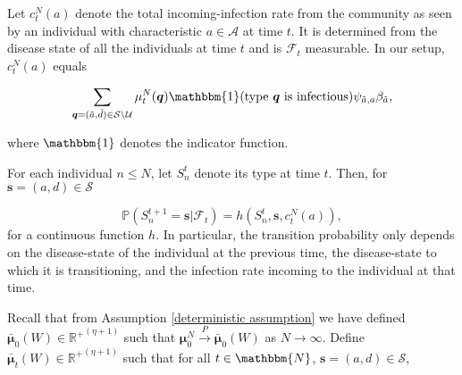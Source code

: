 \documentclass{article}
\theoremstyle{definition}
\newcommand{\Real}{\mathbb{R}}
\begin{document}
 Let $c^N_{t}({a})$ denote the total incoming-infection rate from the community as seen by an individual with characteristic ${a}\in\mathcal A$ at time $t$.  It is determined from the disease state of all the individuals at time  $t$ and is $\mathcal F_{t}$ measurable. In our setup, $c^N_{t}({a})$ equals 
 
  \begin{equation}
    \sum\limits_{\bm{q}=(\tilde{a},\tilde{d}) \in \mathcal S \setminus  \mathcal U} \mu^N_{t}(\bm{q}) \mathbbm{1}(\text{type }\bm{q} \text{ is infectious}) \psi_{\tilde{a},{a}} \beta_{\tilde{a}},
    \label{cnt}
    \end{equation}
  

 
 
  
  
  
 
  
  where $\mathbbm{1}$ denotes the indicator function. 
  
  For each individual $n \leq N$, let $S^t_n$ denote its type at time $t$.  Then,  for  $\bm{s}=(a,d) \in \mathcal S$
  
  $$\mathbb{P}\left( S^{t+1}_n = \bm{s} | \mathcal F_{t} \right) = {h}(S^{t}_n, \bm{s},  c^N_{t}({a})),$$
 for a continuous function $h$. 
 In particular, the transition probability only depends on the disease-state of the individual at the previous time, the disease-state to which it is transitioning, and the infection rate incoming to the individual at that time. 


 
Recall that from Assumption \ref{deterministic assumption} we have defined $\bm{\bar{\mu}}_{0}(W) \in {\Real^+}^{(\eta+1)}$
such that  $\bm{\mu}^N_{0} \xrightarrow{P} \bm{\bar{\mu}}_{0}(W)$ as $N \rightarrow \infty$. Define  $\bm{\bar{\mu}}_{t}(W) \in {\Real^+}^{(\eta+1)}$ such that for all $t\in\mathbbm{N}$, $\bm{s}=(a,d) \in \mathcal S$,
\end{document}
